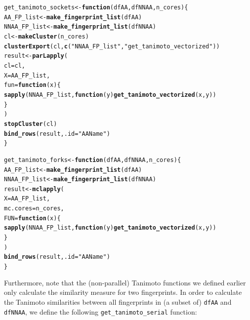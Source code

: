 \documentclass[a4paper,11pt]{article}\usepackage[]{graphicx}\usepackage[]{xcolor}
\makeatletter
\newcommand{\hlsng}[1]{\textcolor[rgb]{0.192,0.494,0.8}{#1}}%
\newcommand{\hldef}[1]{\textcolor[rgb]{0.345,0.345,0.345}{#1}}%
\newcommand{\hlkwa}[1]{\textcolor[rgb]{0.161,0.373,0.58}{\textbf{#1}}}%
\newcommand{\hlkwb}[1]{\textcolor[rgb]{0.69,0.353,0.396}{#1}}%
\newcommand{\hlkwc}[1]{\textcolor[rgb]{0.333,0.667,0.333}{#1}}%
\newcommand{\hlkwd}[1]{\textcolor[rgb]{0.737,0.353,0.396}{\textbf{#1}}}%
\newenvironment{kframe}{%
 \def\at@end@of@kframe{}%
 \ifinner\ifhmode%
  \def\at@end@of@kframe{\end{minipage}}%
  \begin{minipage}{\columnwidth}%
 \fi\fi%
 \def\FrameCommand##1{\hskip\@totalleftmargin \hskip-\fboxsep
 \colorbox{shadecolor}{##1}\hskip-\fboxsep
     \hskip-\linewidth \hskip-\@totalleftmargin \hskip\columnwidth}%
 \MakeFramed {\advance\hsize-\width
   \@totalleftmargin\z@ \linewidth\hsize
   \@setminipage}}%
 {\par\unskip\endMakeFramed%
 \at@end@of@kframe}
\newenvironment{knitrout}{}{} %
\newcommand{\code}[1]{\texttt{#1}}
\makeatother
\begin{document}
\begin{enumerate}
\begin{knitrout}
\begin{kframe}
\begin{alltt}
\hldef{get_tanimoto_sockets} \hlkwb{<-} \hlkwa{function}\hldef{(}\hlkwc{dfAA}\hldef{,} \hlkwc{dfNNAA}\hldef{,} \hlkwc{n_cores}\hldef{) \{}
  \hldef{AA_FP_list} \hlkwb{<-} \hlkwd{make_fingerprint_list}\hldef{(dfAA)}
  \hldef{NNAA_FP_list} \hlkwb{<-} \hlkwd{make_fingerprint_list}\hldef{(dfNNAA)}
  \hldef{cl} \hlkwb{<-} \hlkwd{makeCluster}\hldef{(n_cores)}
  \hlkwd{clusterExport}\hldef{(cl,} \hlkwd{c}\hldef{(}\hlsng{"NNAA_FP_list"}\hldef{,} \hlsng{"get_tanimoto_vectorized"}\hldef{))}
  \hldef{result} \hlkwb{<-} \hlkwd{parLapply}\hldef{(}
    \hlkwc{cl} \hldef{= cl,}
    \hlkwc{X} \hldef{= AA_FP_list,}
    \hlkwc{fun} \hldef{=} \hlkwa{function}\hldef{(}\hlkwc{x}\hldef{) \{}
      \hlkwd{sapply}\hldef{(NNAA_FP_list,} \hlkwa{function}\hldef{(}\hlkwc{y}\hldef{)} \hlkwd{get_tanimoto_vectorized}\hldef{(x, y))}
    \hldef{\}}
  \hldef{)}
  \hlkwd{stopCluster}\hldef{(cl)}
  \hlkwd{bind_rows}\hldef{(result,} \hlkwc{.id} \hldef{=} \hlsng{"AAName"}\hldef{)}
\hldef{\}}

\hldef{get_tanimoto_forks} \hlkwb{<-} \hlkwa{function}\hldef{(}\hlkwc{dfAA}\hldef{,} \hlkwc{dfNNAA}\hldef{,} \hlkwc{n_cores}\hldef{) \{}
  \hldef{AA_FP_list} \hlkwb{<-} \hlkwd{make_fingerprint_list}\hldef{(dfAA)}
  \hldef{NNAA_FP_list} \hlkwb{<-} \hlkwd{make_fingerprint_list}\hldef{(dfNNAA)}
  \hldef{result} \hlkwb{<-} \hlkwd{mclapply}\hldef{(}
    \hlkwc{X} \hldef{= AA_FP_list,}
    \hlkwc{mc.cores} \hldef{= n_cores,}
    \hlkwc{FUN} \hldef{=} \hlkwa{function}\hldef{(}\hlkwc{x}\hldef{) \{}
      \hlkwd{sapply}\hldef{(NNAA_FP_list,} \hlkwa{function}\hldef{(}\hlkwc{y}\hldef{)} \hlkwd{get_tanimoto_vectorized}\hldef{(x, y))}
    \hldef{\}}
  \hldef{)}
  \hlkwd{bind_rows}\hldef{(result,} \hlkwc{.id} \hldef{=} \hlsng{"AAName"}\hldef{)}
\hldef{\}}
\end{alltt}
\end{kframe}
\end{knitrout}

Furthermore, note that the (non-parallel) Tanimoto functions we defined earlier only calculate the similarity measure for two fingerprints. In order to calculate the Tanimoto similarities between all fingerprints in (a subset of) \code{dfAA} and \code{dfNNAA}, we define the following \code{get\_tanimoto\_serial} function: 


\end{enumerate}
\end{document}
